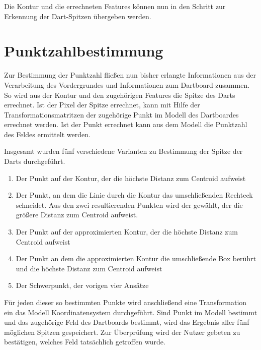 Die Kontur und die errechneten Features können nun in den Schritt zur Erkennung der Dart-Spitzen übergeben werden.


\section{Punktzahlbestimmung}
\label{sec:score}
Zur Bestimmung der Punktzahl fließen nun bisher erlangte Informationen aus der Verarbeitung des Vordergrundes  und Informationen zum Dartboard  zusammen.
So wird aus der Kontur und den zugehörigen Features die Spitze des Darts errechnet. Ist der Pixel der Spitze errechnet, kann mit Hilfe der Transformationsmatritzen der zugehörige Punkt im Modell des Dartboardes errechnet werden. Ist der Punkt errechnet kann aus dem Modell die Punktzahl des Feldes ermittelt werden. 

Insgesamt wurden fünf verschiedene Varianten zu Bestimmung der Spitze der Darts durchgeführt. 
\begin{enumerate}
	\item Der Punkt auf der Kontur, der die höchste Distanz zum Centroid aufweist
	\item Der Punkt, an dem die Linie durch die Kontur das umschließenden Rechteck schneidet. Aus den zwei resultierenden Punkten wird der gewählt, der die größere Distanz zum Centroid aufweist.
	\item Der Punkt auf der approximierten Kontur, der die höchste Distanz zum Centroid  aufweist
	\item Der Punkt an dem die approximierten Kontur die umschließende Box berührt und die höchste Distanz zum Centroid aufweist
	\item Der Schwerpunkt, der vorigen vier Ansätze
\end{enumerate}

Für jeden dieser so bestimmten Punkte wird anschließend eine Transformation ein das Modell Koordinatensystem durchgeführt. 
Sind Punkt im Modell bestimmt und das zugehörige Feld des Dartboards bestimmt, wird das Ergebnis aller fünf möglichen Spitzen gespeichert. Zur Überprüfung wird der Nutzer gebeten zu bestätigen, welches Feld tatsächlich getroffen wurde. 



